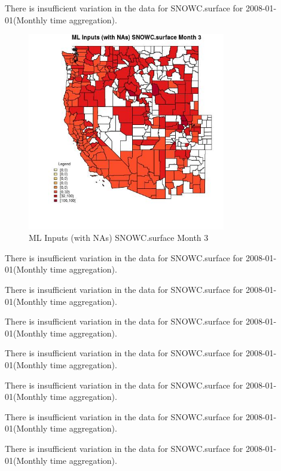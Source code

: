 There is insufficient variation in the data for SNOWC.surface for 2008-01-01(Monthly time aggregation). 
 

\begin{figure} 
\centering  
\includegraphics[width=0.77\textwidth]{Code_Outputs/Report_ML_input_PM25_Step4_part_f_de_duplicated_aveswNAs_CountySNOWCsurfacemedianMonth3.jpg} 
\caption{\label{fig:Report_ML_input_PM25_Step4_part_f_de_duplicated_aveswNAsCountySNOWCsurfacemedianMonth3}ML Inputs (with NAs) SNOWC.surface Month 3} 
\end{figure} 
 

There is insufficient variation in the data for SNOWC.surface for 2008-01-01(Monthly time aggregation). 
 

There is insufficient variation in the data for SNOWC.surface for 2008-01-01(Monthly time aggregation). 
 

There is insufficient variation in the data for SNOWC.surface for 2008-01-01(Monthly time aggregation). 
 

There is insufficient variation in the data for SNOWC.surface for 2008-01-01(Monthly time aggregation). 
 

There is insufficient variation in the data for SNOWC.surface for 2008-01-01(Monthly time aggregation). 
 

There is insufficient variation in the data for SNOWC.surface for 2008-01-01(Monthly time aggregation). 
 

There is insufficient variation in the data for SNOWC.surface for 2008-01-01(Monthly time aggregation). 
 

